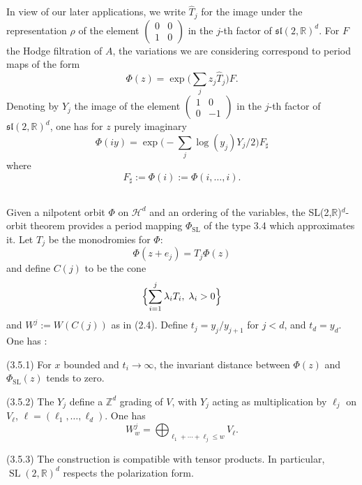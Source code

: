 \documentclass[11pt,a4paper]{article}
\theoremstyle{plain}
\theoremstyle{definition}
\DeclareMathOperator{\SL}{SL}
\begin{document}
In view of our later applications, we write $\hat{T}_j$ for the image under the representation $\rho$ of the element $\begin{pmatrix} 0 & 0 \\ 1 & 0\end{pmatrix}$ in the $j$-th factor of $\mathfrak{sl}(2,\mathbb{R})^d$. For $F$ the Hodge filtration of $A$, the variations we are considering correspond to period maps of the form
\begin{equation}\label{eq:sl2period}
\Phi(z)=\exp\bigl(\sum_j z_j\hat{T}_j\bigr)F.
\end{equation}
Denoting by $Y_j$ the image of the element $\begin{pmatrix} 1 & 0 \\ 0 & -1\end{pmatrix}$ in the $j$-th factor of $\mathfrak{sl}(2,\mathbb{R})^d$, one has for $z$ purely imaginary
\begin{equation}\label{eq:imaginary}
\Phi(iy)=\exp\bigl(-\sum_j\log(y_j)Y_j/2\bigr)F_{\sharp}
\end{equation}
where
\begin{equation}\label{eq:fsharp}
F_{\sharp}:=\Phi(i):=\Phi(i,\dots,i).
\end{equation}

\subsection{}
Given a nilpotent orbit $\Phi$ on $\mathcal{H}^d$ and an ordering of the variables, the SL(2,$\mathbb{R}$)$^d$-orbit theorem provides a period mapping $\Phi_{\SL}$ of the type 3.4 which approximates it. Let $T_j$ be the monodromies for $\Phi$:
\[
\Phi(z+e_j)=T_j\Phi(z)
\]
and define $C(j)$ to be the cone
\[
\Bigl\{\sum_{i=1}^j\lambda_i T_i,\; \lambda_i>0\Bigr\}
\]
and $W^j:=W(C(j))$ as in (2.4). Define $t_j=y_j/y_{j+1}$ for $j<d$, and $t_d=y_d$. One has \cite{cks}:

(3.5.1) For $x$ bounded and $t_i\to\infty$, the invariant distance between $\Phi(z)$ and $\Phi_{\SL}(z)$ tends to zero.

(3.5.2) The $Y_j$ define a $\mathbb{Z}^d$ grading of $V$, with $Y_j$ acting as multiplication by $\ell_j$ on $V_{\ell}$, $\ell=(\ell_1,\dots,\ell_d)$. One has
\[
W^j_w=\bigoplus_{\ell_1+\cdots+\ell_j\leq w} V_{\ell}.
\]

(3.5.3) The construction is compatible with tensor products. In particular, $\SL(2,\mathbb{R})^d$ respects the polarization form.
\end{document}

